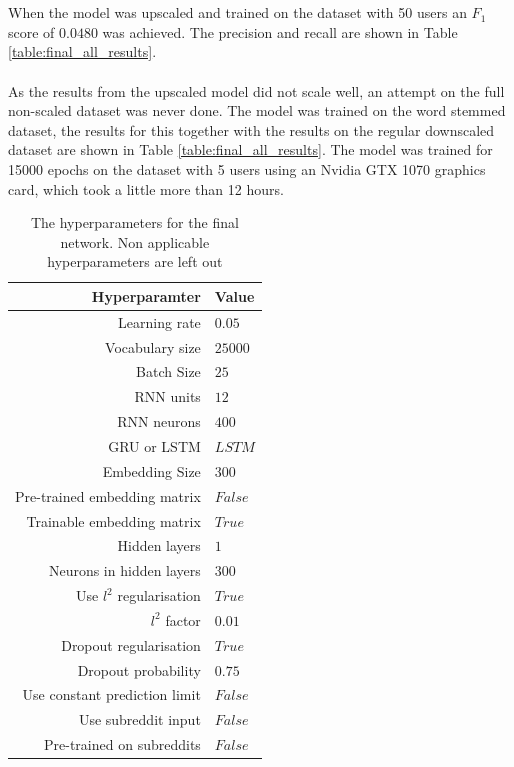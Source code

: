 \\\\
When the model was upscaled and trained on the dataset with 50 users an $F_1$ score of $0.0480$ was achieved. The precision and recall are shown in Table \ref{table:final_all_results}.
\\\\
As the results from the upscaled model did not scale well, an attempt on the full non-scaled dataset was never done. The model was trained on the word stemmed dataset, the results for this together with the results on the regular downscaled dataset are shown in Table \ref{table:final_all_results}. The model was trained for 15000 epochs on the dataset with 5 users using an Nvidia GTX 1070 graphics card, which took a little more than 12 hours.
\begin{table}[h!]
    \centering
    \begin{tabular}{ r  l }
        \textbf{Hyperparamter}  &  \textbf{Value} \\ \hline \hline
        Learning rate & $0.05$  \\ \hline
        Vocabulary size & $25000$ \\ \hline
        Batch Size & $25$ \\ \hline
        RNN units & $12$  \\ \hline
        RNN neurons & $400$ \\ \hline
        GRU or LSTM & $LSTM$ \\ \hline
        Embedding Size & $300$ \\ \hline
        Pre-trained embedding matrix & $False$ \\ \hline
        Trainable embedding matrix & $True$ \\ \hline
        Hidden layers & $1$ \\ \hline
        Neurons in hidden layers & $300$ \\ \hline
        Use $l^2$ regularisation & $True$ \\ \hline
        $l^2$ factor & $0.01$ \\ \hline
        Dropout regularisation & $True$\\ \hline
        Dropout probability & $0.75$ \\ \hline
        Use constant prediction limit & $False$ \\ \hline
        Use subreddit input & $False$ \\ \hline
        Pre-trained on subreddits & $False$ \\ \hline
    \end{tabular}
    \caption{The hyperparameters for the final network. Non applicable hyperparameters are left out}
    \label{table:hyperparameters_final}
\end{table}
